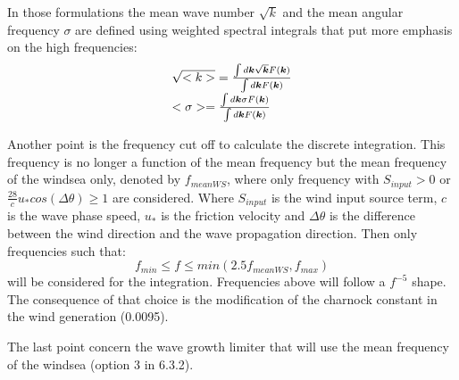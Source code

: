  In those formulations the mean wave number $\sqrt{k}$
 and the mean angular frequency $\sigma$ are defined using weighted spectral integrals that put more emphasis on the high frequencies:
$$
\barr{l}
\sqrt{<k>}=\frac{\int d \vec{k}\sqrt{\vec{k}}F(\vec{k})}{\int d \vec{k}F(\vec{k})} \\[6pt]
<\sigma>=\frac{\int d \vec{k}\sigma F(\vec{k})}{\int d \vec{k}F(\vec{k})}
\earr
$$

 Another point is the frequency cut off to calculate the discrete integration. This frequency is no longer a function of the mean frequency but the mean frequency of the windsea only, denoted by $f_{meanWS}$, where only frequency with $S_{input}>0$ or $\frac{28}{c}u_*cos(\Delta  \theta) \ge 1$  are considered. Where $S_{input}$ is the wind input source term, $c$ is the wave phase speed, $u_*$ is the friction velocity and $\Delta  \theta$ is the difference between the wind direction and the wave propagation direction. Then only frequencies such that:
$$
f_{min}\le f \le min(2.5 f_{meanWS},f_{max})
$$
 will be considered for the integration. Frequencies above will follow a $f^{-5}$ shape. The consequence of that choice is the modification of the charnock constant in the wind generation (0.0095).

 The last point concern the wave growth limiter that will use the mean frequency of the windsea (option 3 in 6.3.2). 